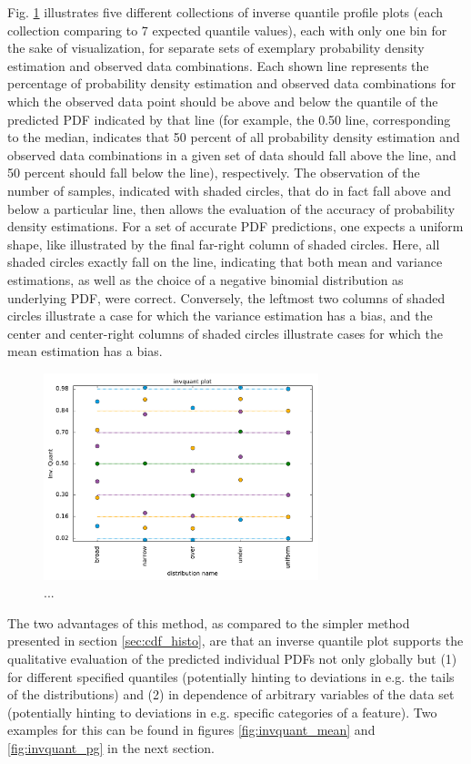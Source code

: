 \documentclass[BCOR=1mm, DIV=calc,10pt,
twoside=true,
twocolumn,
headings=normal]{scrartcl}
\newcommand{\fig}{Fig. }
\begin{document}
\fig \ref{fig:invquant_profiles} illustrates five different collections of inverse quantile profile plots (each collection comparing to 7 expected quantile values), each with only one bin for the sake of visualization, for separate sets of exemplary probability density estimation and observed data combinations. Each shown line represents the percentage of probability density estimation and observed data combinations for which the observed data point should be above and below the quantile of the predicted PDF indicated by that line (for example, the 0.50 line, corresponding to the median, indicates that 50 percent of all probability density estimation and observed data combinations in a given set of data should fall above the line, and 50 percent should fall below the line), respectively. The observation of the number of samples, indicated with shaded circles, that do in fact fall above and below a particular line, then allows the evaluation of the accuracy of probability density estimations. For a set of accurate PDF predictions, one expects a uniform shape, like illustrated by the final far-right column of shaded circles. Here, all shaded circles exactly fall on the line, indicating that both mean and variance estimations, as well as the choice of a negative binomial distribution as underlying PDF, were correct. Conversely, the leftmost two columns of shaded circles illustrate a case for which the variance estimation has a bias, and the center and center-right columns of shaded circles illustrate cases for which the mean estimation has a bias.

\begin{figure}
\begin{center}
\includegraphics[width=8cm]{../figures/invquant_profiles}
\caption{\label{fig:invquant_profiles} ...}
\end{center}
\end{figure}

The two advantages of this method, as compared to the simpler method presented in section \ref{sec:cdf_histo}, are that an inverse quantile plot supports the qualitative evaluation of the predicted individual PDFs not only globally but (1) for different specified quantiles (potentially hinting to deviations in e.g. the tails of the distributions) and (2) in dependence of arbitrary variables of the data set (potentially hinting to deviations in e.g. specific categories of a feature). Two examples for this can be found in figures \ref{fig:invquant_mean} and \ref{fig:invquant_pg} in the next section.
\end{document}
